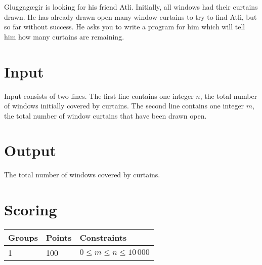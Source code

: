 
Gluggagægir is looking for his friend Atli.
Initially, all windows had their curtains drawn.
He has already drawn open many window curtains to try to find Atli, but so far without success.
He asks you to write a program for him which will tell him how many curtains are remaining.

\section*{Input}
Input consists of two lines.
The first line contains one integer $n$, the total number of windows initially covered by curtains.
The second line contains one integer $m$, the total number of window curtains that have been drawn open.

\section*{Output}
The total number of windows covered by curtains.

\section*{Scoring}
\begin{tabular}{|l|l|l|}
\hline
Groups & Points & Constraints \\ \hline
1     & 100   & $0 \leq m \leq n \leq 10\,000$ \\ \hline
\end{tabular}

